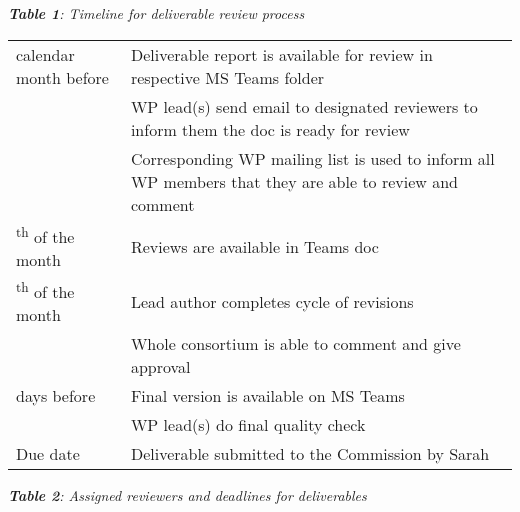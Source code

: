\documentclass[
]{article}
\begin{document}
\emph{\textbf{Table 1}: Timeline for deliverable review process}

\begin{longtable}[]{@{}
  >{\raggedright\arraybackslash}p{}
  >{\raggedright\arraybackslash}p{}@{}}
\toprule()
\endhead
1 calendar month before & Deliverable report is available for review in respective MS Teams folder \\
& WP lead(s) send email to designated reviewers to inform them the doc is ready for review \\
& Corresponding WP mailing list is used to inform all WP members that they are able to review and comment \\
10\textsuperscript{th} of the month & Reviews are available in Teams doc \\
17\textsuperscript{th} of the month & Lead author completes cycle of revisions \\
& Whole consortium is able to comment and give approval \\
2 days before & Final version is available on MS Teams \\
& WP lead(s) do final quality check \\
Due date & Deliverable submitted to the Commission by Sarah \\
\bottomrule()
\end{longtable}

\emph{\textbf{Table 2}: Assigned reviewers and deadlines for deliverables}
\end{document}
